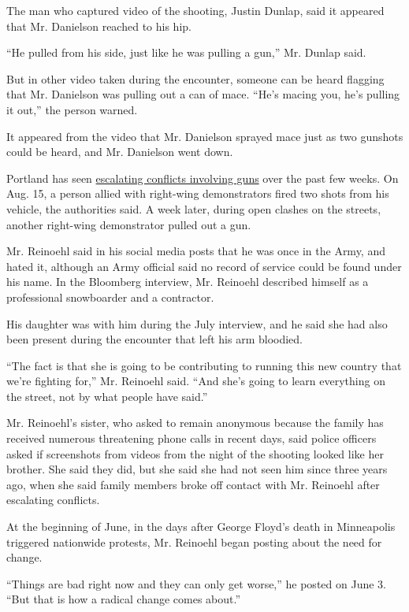 The man who captured video of the shooting, Justin Dunlap, said it
appeared that Mr. Danielson reached to his hip.

``He pulled from his side, just like he was pulling a gun,'' Mr. Dunlap
said.

But in other video taken during the encounter, someone can be heard
flagging that Mr. Danielson was pulling out a can of mace. ``He's macing
you, he's pulling it out,'' the person warned.

It appeared from the video that Mr. Danielson sprayed mace just as two
gunshots could be heard, and Mr. Danielson went down.

Portland has seen
\href{https://www.nytimes3xbfgragh.onion/2020/09/01/us/portland-kenosha-protests-clashes.html}{escalating
conflicts involving guns} over the past few weeks. On Aug. 15, a person
allied with right-wing demonstrators fired two shots from his vehicle,
the authorities said. A week later, during open clashes on the streets,
another right-wing demonstrator pulled out a gun.

Mr. Reinoehl said in his social media posts that he was once in the
Army, and hated it, although an Army official said no record of service
could be found under his name. In the Bloomberg interview, Mr. Reinoehl
described himself as a professional snowboarder and a contractor.

His daughter was with him during the July interview, and he said she had
also been present during the encounter that left his arm bloodied.

``The fact is that she is going to be contributing to running this new
country that we're fighting for,'' Mr. Reinoehl said. ``And she's going
to learn everything on the street, not by what people have said.''

Mr. Reinoehl's sister, who asked to remain anonymous because the family
has received numerous threatening phone calls in recent days, said
police officers asked if screenshots from videos from the night of the
shooting looked like her brother. She said they did, but she said she
had not seen him since three years ago, when she said family members
broke off contact with Mr. Reinoehl after escalating conflicts.

At the beginning of June, in the days after George Floyd's death in
Minneapolis triggered nationwide protests, Mr. Reinoehl began posting
about the need for change.

``Things are bad right now and they can only get worse,'' he posted on
June 3. ``But that is how a radical change comes about.''

